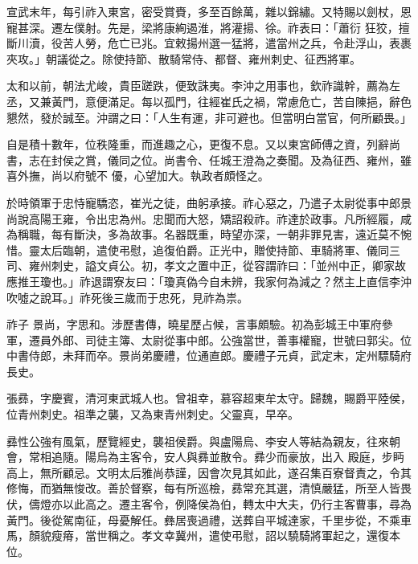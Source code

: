 \begin{pinyinscope}
 宣武末年，每引祚入東宮，密受賞賚，多至百餘萬，雜以錦繡。又特賜以劍杖，恩寵甚深。遷左僕射。先是，梁將康絢遏淮，將灌揚、徐。祚表曰：「蕭衍
 狂狡，擅斷川瀆，役苦人勞，危亡已兆。宜敕揚州選一猛將，遣當州之兵，令赴浮山，表裹夾攻。」朝議從之。除使持節、散騎常侍、都督、雍州刺史、征西將軍。



 太和以前，朝法尤峻，貴臣蹉跌，便致誅夷。李沖之用事也，欽祚識幹，薦為左丞，又兼黃門，意便滿足。每以孤門，往經崔氏之禍，常慮危亡，苦自陳挹，辭色懇然，發於誠至。沖謂之曰：「人生有運，非可避也。但當明白當官，何所顧畏。」



 自是積十數年，位秩隆重，而進趣之心，更復不息。又以東宮師傅之資，列辭尚書，志在封侯之賞，儀同之位。尚書令、任城王澄為之奏聞。及為征西、雍州，雖喜外撫，尚以府號不
 優，心望加大。執政者頗怪之。



 於時領軍于忠恃寵驕恣，崔光之徒，曲躬承接。祚心惡之，乃遣子太尉從事中郎景尚說高陽王雍，令出忠為州。忠聞而大怒，矯詔殺祚。祚達於政事。凡所經履，咸為稱職，每有斷決，多為故事。名器既重，時望亦深，一朝非罪見害，遠近莫不惋惜。靈太后臨朝，遣使弔慰，追復伯爵。正光中，贈使持節、車騎將軍、儀同三司、雍州刺史，謚文貞公。初，孝文之置中正，從容謂祚曰：「並州中正，卿家故應推王瓊也。」祚退謂寮友曰：「瓊真偽今自未辨，我家何為減之？然主上直信李沖吹噓之說耳。」祚死後三歲而于忠死，見祚為祟。



 祚子
 景尚，字思和。涉歷書傳，曉星歷占候，言事頗驗。初為彭城王中軍府參軍，遷員外郎、司徒主簿、太尉從事中郎。公強當世，善事權寵，世號曰郭尖。位中書侍郎，未拜而卒。景尚弟慶禮，位通直郎。慶禮子元貞，武定末，定州驃騎府長史。



 張彞，字慶賓，清河東武城人也。曾祖幸，慕容超東牟太守。歸魏，賜爵平陸侯，位青州刺史。祖準之襲，又為東青州刺史。父靈真，早卒。



 彞性公強有風氣，歷覽經史，襲祖侯爵。與盧陽烏、李安人等結為親友，往來朝會，常相追隨。陽烏為主客令，安人與彞並散令。彞少而豪放，出入
 殿庭，步眄高上，無所顧忌。文明太后雅尚恭謹，因會次見其如此，遂召集百寮督責之，令其修悔，而猶無悛改。善於督察，每有所巡檢，彞常充其選，清慎嚴猛，所至人皆畏伏，儔燈亦以此高之。遷主客令，例降侯為伯，轉太中大夫，仍行主客曹事，尋為黃門。後從駕南征，母憂解任。彝居喪過禮，送葬自平城達家，千里步從，不乘車馬，顏貌瘦瘠，當世稱之。孝文幸冀州，遣使弔慰，詔以驍騎將軍起之，還復本位。




\end{pinyinscope}

